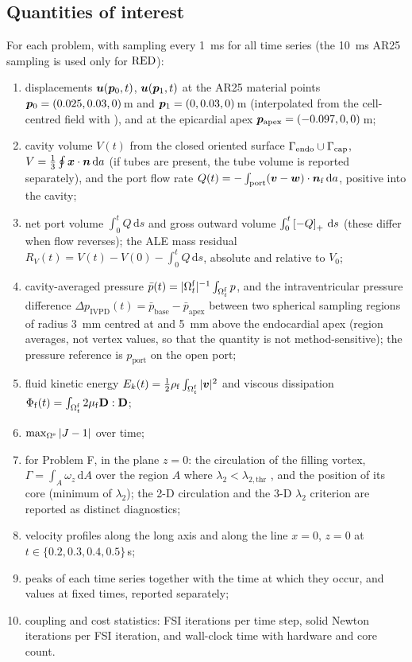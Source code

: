 \subsection{Quantities of interest}\label{sec:qoi}
For each problem, with sampling every \SI{1}{ms} for all time series (the
\SI{10}{ms} AR25 sampling is used only for $\mathrm{RED}$):
\begin{enumerate}
\item displacements $\bm{u}(\bm{p}_0,t)$, $\bm{u}(\bm{p}_1,t)$ at the AR25
  material points $\bm{p}_0=(0.025,0.03,0)$\,m and $\bm{p}_1=(0,0.03,0)$\,m
  (interpolated from the cell-centred field with ), and
  at the epicardial apex $\bm{p}_{\mathrm{apex}}=(-0.097,0,0)$\,m;
\item cavity volume $V(t)$ from the closed oriented surface
  $\Gamma_{\mathrm{endo}}\cup\Gamma_{\mathrm{cap}}$, $V=\tfrac13\oint\bm{x}\cdot\bm{n}\,\mathrm da$ (if tubes
  are present, the tube volume is reported separately), and the port flow
  rate $Q(t)=-\int_{\mathrm{port}}(\bm{v}-\bm{w})\cdot\bm{n}_{\mathrm f}\,\mathrm da$,
  positive into the cavity;
\item net port volume $\int_0^t Q\,\mathrm ds$ and gross outward volume
  $\int_0^t\left[-Q\right]_{+}\,\mathrm ds$ (these differ when flow reverses); the
  ALE mass residual
  $R_V(t) = V(t)-V(0)-\int_0^t Q\,\mathrm ds$, absolute and relative to $V_0$;
\item cavity-averaged pressure $\bar p(t)=|\Omega^{\mathrm{f}}_t|^{-1}\int_{\Omega^{\mathrm{f}}_t}p$, and the
  intraventricular pressure difference
  $\Delta p_{\mathrm{IVPD}}(t)=\bar p_{\mathrm{base}}-\bar p_{\mathrm{apex}}$
  between two spherical sampling regions of radius \SI{3}{mm} centred at
   and \SI{5}{mm} above the endocardial apex (region
  averages, not vertex values, so that the quantity is not method-sensitive);
  the pressure reference is $p_{\mathrm{port}}$ on the open port;
\item fluid kinetic energy $E_k(t)=\tfrac12\rho_{\mathrm f}\int_{\Omega^{\mathrm{f}}_t}|\bm{v}|^2$
  and viscous dissipation $\Phi_{\mathrm f}(t)=\int_{\Omega^{\mathrm{f}}_t}2\mu_{\mathrm f}\mathbf{D}:\mathbf{D}$;
\item $\max_{\Omega^{\mathrm{s}}}|J-1|$ over time;
\item for Problem F, in the plane $z=0$: the circulation of the filling
  vortex, $\Gamma=\int_{A}\omega_z\,\mathrm dA$ over the region $A$ where
  $\lambda_2<\lambda_{2,\mathrm{thr}}$ , and the
  position of its core (minimum of $\lambda_2$); the 2-D circulation and the
  3-D $\lambda_2$ criterion are reported as distinct diagnostics;
\item velocity profiles along the long axis and along the line
  $x=0$, $z=0$ at $t\in\{0.2,0.3,0.4,0.5\}$\,s;
\item peaks of each time series together with the time at which they occur,
  and values at fixed times, reported separately;
\item coupling and cost statistics: FSI iterations per time step, solid
  Newton iterations per FSI iteration, and wall-clock time with hardware
  and core count.
\end{enumerate}

